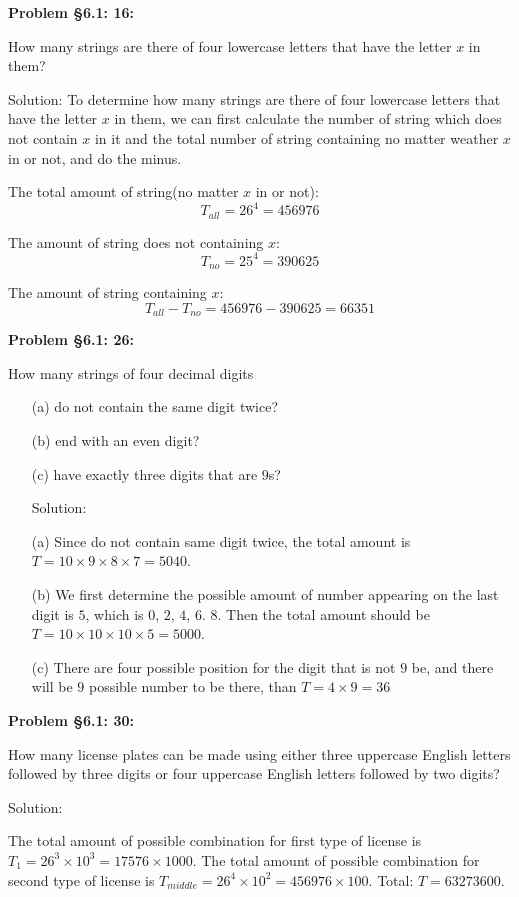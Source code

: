 \documentclass{article}
\newenvironment{problem}[1]
{\begin{mdframed}[default]
\textbf{Problem #1:}
}
{\end{mdframed}
}
\begin{document}
\begin{problem}{\S 6.1: 16}
How many strings are there of four lowercase letters that have the letter $x$ in
them?

Solution:
To determine how many strings are there of four lowercase letters that have the letter $x$ in them, we can first calculate the number of string which does not contain $x$ in it and the total number of string containing no matter weather $x$ in or not, and do the minus.

The total amount of string(no matter $x$ in or not):
\[T_{all}=26^4=456976\]

The amount of string does not containing $x$:
\[T_{no}=25^4=390625\]

The amount of string containing $x$:
\[T_{all}-T_{no}=456976-390625=66351\]

\end{problem}
\begin{problem}{\S 6.1: 26}
How many strings of four decimal digits
\begin{enumerate}
\item[(a)] do not contain the same digit twice?
\item[(b)] end with an even digit?
\item[(c)] have exactly three digits that are $9$s?

Solution:

(a) Since do not contain same digit twice, the total amount is $T=10\times9\times8\times7=5040$.

(b) We first determine the possible amount of number appearing on the last digit is $5$, which is $0$, $2$, $4$, $6$. $8$.
Then the total amount should be $T=10\times10\times10\times5=5000$.

(c) There are four possible position for the digit that is not $9$ be, and there will be $9$ possible number to be there, than $T=4\times9=36$

\end{enumerate}
\end{problem}
\begin{problem}{\S 6.1: 30}
How many license plates can be made using either three uppercase English letters
followed by three digits or four uppercase English letters followed by two digits?

Solution:

The total amount of possible combination for first type of license is $T_{1}=26^3\times10^3=17576\times1000$.
The total amount of possible combination for second type of license is $T_{middle}=26^4\times10^2=456976\times100$.
Total: $T=63273600$.
\end{problem}
\end{document}
